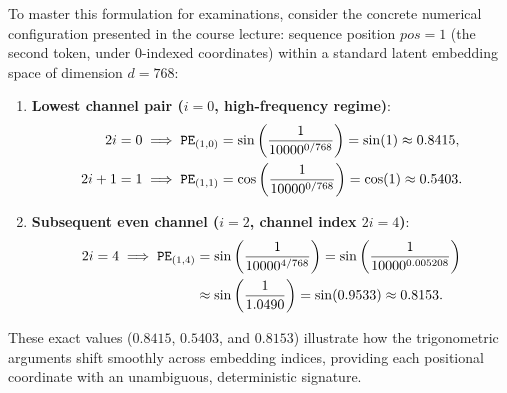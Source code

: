 \documentclass[../../main.tex]{subfiles}
\begin{document}
\begin{examinsight}
To master this formulation for examinations, consider the concrete numerical configuration presented in the course lecture: sequence position $pos = 1$ (the second token, under $0$-indexed coordinates) within a standard latent embedding space of dimension $d = 768$:
\begin{enumerate}
    \item \textbf{Lowest channel pair ($i = 0$, high-frequency regime)}:
    \begin{align}
        2i = 0 &\implies \text{\texttt{PE}}_{(1, 0)} = \sin\left(\frac{1}{10000^{0 / 768}}\right) = \sin(1) \approx 0.8415, \\
        2i+1 = 1 &\implies \text{\texttt{PE}}_{(1, 1)} = \cos\left(\frac{1}{10000^{0 / 768}}\right) = \cos(1) \approx 0.5403.
    \end{align}
    \item \textbf{Subsequent even channel ($i = 2$, channel index $2i = 4$)}:
    \begin{align}
        2i = 4 \implies \text{\texttt{PE}}_{(1, 4)} &= \sin\left(\frac{1}{10000^{4 / 768}}\right) = \sin\left(\frac{1}{10000^{0.005208}}\right) \nonumber \\
        &\approx \sin\left(\frac{1}{1.0490}\right) = \sin(0.9533) \approx 0.8153.
    \end{align}
\end{enumerate}
These exact values ($0.8415$, $0.5403$, and $0.8153$) illustrate how the trigonometric arguments shift smoothly across embedding indices, providing each positional coordinate with an unambiguous, deterministic signature.
\end{examinsight}
\end{document}
